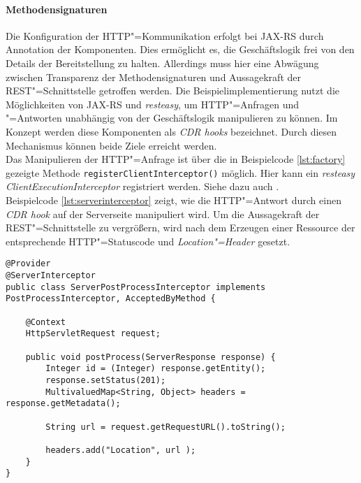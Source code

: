 \paragraph{Methodensignaturen}
Die Konfiguration der \ac{HTTP}"=Kommunikation erfolgt bei \ac{JAX-RS} durch Annotation der Komponenten. Dies ermöglicht es, die Geschäftslogik frei von den Details der Bereitstellung zu halten.
Allerdings muss hier eine Abwägung zwischen Transparenz der Methodensignaturen und Aussagekraft der \ac{REST}"=Schnittstelle getroffen werden.
Die Beispielimplementierung nutzt die Möglichkeiten von \ac{JAX-RS} und \textit{resteasy}, um \ac{HTTP}"=Anfragen und "=Antworten unabhängig von der Geschäftslogik manipulieren zu können. Im Konzept werden diese Komponenten als \textit{CDR hooks} bezeichnet. 
Durch diesen Mechanismus können beide Ziele erreicht werden.\\
Das Manipulieren der \ac{HTTP}"=Anfrage ist über die in Beispielcode \ref{lst:factory} gezeigte Methode \colorbox{mygray}{\lstinline!registerClientInterceptor()!} möglich. Hier kann ein \textit{resteasy ClientExecutionInterceptor} registriert werden. Siehe dazu auch \cite{resteasy}.\\
Beispielcode \ref{lst:serverinterceptor} zeigt, wie die \ac{HTTP}"=Antwort durch einen \textit{CDR hook} auf der Serverseite manipuliert wird. Um die Aussagekraft der \ac{REST}"=Schnittstelle zu vergrößern, wird nach dem Erzeugen einer Ressource der entsprechende \ac{HTTP}"=Statuscode und \textit{Location"=Header} gesetzt. 
\begin{lstlisting}[caption={ServerPostProcessInterceptor},captionpos=b,label=lst:serverinterceptor] 
@Provider
@ServerInterceptor
public class ServerPostProcessInterceptor implements PostProcessInterceptor, AcceptedByMethod {	
	
	@Context
	HttpServletRequest request;
	
	public void postProcess(ServerResponse response) {
		Integer id = (Integer) response.getEntity();
		response.setStatus(201);
		MultivaluedMap<String, Object> headers = response.getMetadata();
		 
		String url = request.getRequestURL().toString();
		
		headers.add("Location", url );
	}
}
\end{lstlisting}

